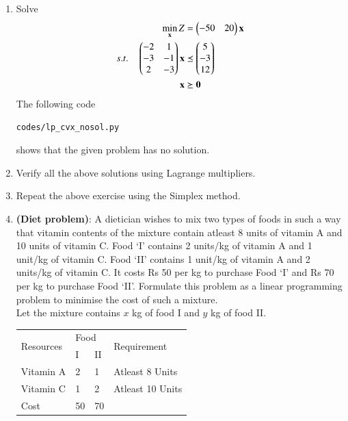 \begin{enumerate}[label=\arabic*.,ref=\thesection.\theenumi]
\item Solve
\begin{align}
\min_{\mathbf{x}} Z &= \begin{pmatrix}-50 & 20\end{pmatrix}\mathbf{x}
\\
s.t. \quad 
\begin{pmatrix}
-2 & 1
\\
-3 & -1
\\
2 & -3
\end{pmatrix}
\mathbf{x} &\preceq \begin{pmatrix}5\\-3\\12\end{pmatrix}
\\
\mathbf{x} &\succeq \mathbf{0}
\end{align}
%
\solution The following code 
\begin{lstlisting}
codes/lp_cvx_nosol.py
\end{lstlisting}
%
shows that the given problem has no solution.
\item Verify all the above solutions using Lagrange multipliers.
\item Repeat the above exercise using the Simplex method.
\item\textbf {(Diet problem)}: A dietician wishes to mix two types of foods in such a
way that vitamin contents of the mixture contain atleast 8 units of vitamin A and 10
units of vitamin C. Food ‘I’ contains 2 units/kg of vitamin A and 1 unit/kg of vitamin C.
Food ‘II’ contains 1 unit/kg of vitamin A and 2 units/kg of vitamin C. It costs
Rs 50 per kg to purchase Food ‘I’ and Rs 70 per kg to purchase Food ‘II’. Formulate
this problem as a linear programming problem to minimise the cost of such a mixture.
\\
\solution Let the mixture contains $x$ kg of food I and $y$ kg of food II.
\\
\begin{table}[!h]
\begin{tabular}{|l|l|l|l|}
\hline
\multirow{2}{*}{Resources} & \multicolumn{2}{l|}{Food} & \multirow{2}{*}{Requirement} \\ \cline{2-3}
                           & I           & II          &                              \\ \hline
Vitamin A                  & 2           & 1           & Atleast 8 Units              \\ \hline
Vitamin C                  & 1           & 2           & Atleast 10 Units             \\ \hline
Cost                       & 50          & 70          &                              \\ \hline
\end{tabular}

\end{table}
\end{enumerate}
